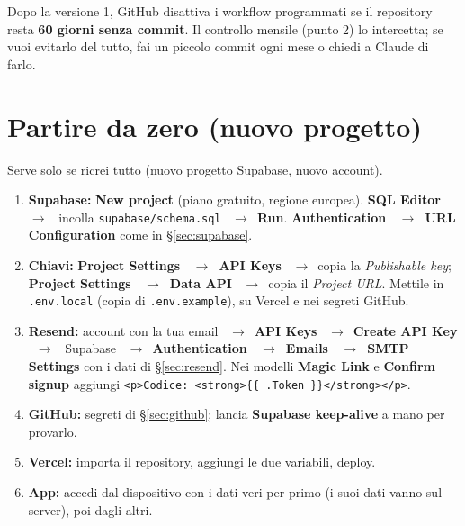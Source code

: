 \documentclass[11pt,a4paper]{article}
\newcommand{\ra}{\unskip\nobreak\ $\rightarrow$\ \ignorespaces}            %
\newcommand{\bt}[1]{\textbf{#1}}               %
\newcommand{\code}[1]{\texttt{#1}}             %
\newcommand{\sezione}[1]{\S\ref{#1}}           %
\begin{document}
\begin{attenzione}
Dopo la versione 1, GitHub disattiva i workflow programmati se il repository resta \bt{60 giorni
senza commit}. Il controllo mensile (punto 2) lo intercetta; se vuoi evitarlo del tutto, fai un
piccolo commit ogni mese o chiedi a Claude di farlo.
\end{attenzione}

\section{Partire da zero (nuovo progetto)}\label{sec:zero}

Serve solo se ricrei tutto (nuovo progetto Supabase, nuovo account).

\begin{enumerate}
  \item \bt{Supabase:} \bt{New project} (piano gratuito, regione europea). \bt{SQL Editor} \ra
    incolla \code{supabase/schema.sql} \ra \bt{Run}. \bt{Authentication \ra URL Configuration}
    come in \sezione{sec:supabase}.
  \item \bt{Chiavi:} \bt{Project Settings \ra API Keys} \ra copia la \emph{Publishable key};
    \bt{Project Settings \ra Data API} \ra copia il \emph{Project URL}. Mettile in
    \code{.env.local} (copia di \code{.env.example}), su Vercel e nei segreti GitHub.
  \item \bt{Resend:} account con la tua email \ra \bt{API Keys} \ra \bt{Create API Key} \ra
    Supabase \ra \bt{Authentication \ra Emails \ra SMTP Settings} con i dati di \sezione{sec:resend}.
    Nei modelli \bt{Magic Link} e \bt{Confirm signup} aggiungi
    \code{<p>Codice: <strong>\{\{ .Token \}\}</strong></p>}.
  \item \bt{GitHub:} segreti di \sezione{sec:github}; lancia \bt{Supabase keep-alive} a mano per provarlo.
  \item \bt{Vercel:} importa il repository, aggiungi le due variabili, deploy.
  \item \bt{App:} accedi dal dispositivo con i dati veri per primo (i suoi dati vanno sul server),
    poi dagli altri.
\end{enumerate}
\end{document}
